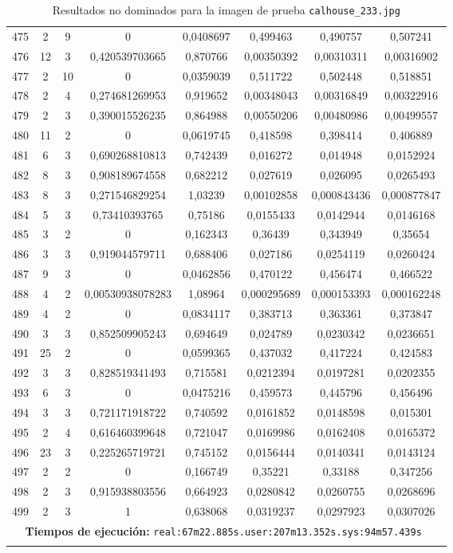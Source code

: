 \begin{longtable}{|c|c|c|c|c|c|c|c|}
475 & 2 & 9 & 0 & 0,0408697 & 0,499463 & 0,490757 & 0,507241  \\
476 & 12 & 3 & 0,420539703665 & 0,870766 & 0,00350392 & 0,00310311 & 0,00316902  \\
477 & 2 & 10 & 0 & 0,0359039 & 0,511722 & 0,502448 & 0,518851  \\
478 & 2 & 4 & 0,274681269953 & 0,919652 & 0,00348043 & 0,00316849 & 0,00322916  \\
479 & 2 & 3 & 0,390015526235 & 0,864988 & 0,00550206 & 0,00480986 & 0,00499557  \\
480 & 11 & 2 & 0 & 0,0619745 & 0,418598 & 0,398414 & 0,406889  \\
481 & 6 & 3 & 0,690268810813 & 0,742439 & 0,016272 & 0,014948 & 0,0152924  \\
482 & 8 & 3 & 0,908189674558 & 0,682212 & 0,027619 & 0,026095 & 0,0265493  \\
483 & 8 & 3 & 0,271546829254 & 1,03239 & 0,00102858 & 0,000843436 & 0,000877847  \\
484 & 5 & 3 & 0,73410393765 & 0,75186 & 0,0155433 & 0,0142944 & 0,0146168  \\
485 & 3 & 2 & 0 & 0,162343 & 0,36439 & 0,343949 & 0,35654  \\
486 & 3 & 3 & 0,919044579711 & 0,688406 & 0,027186 & 0,0254119 & 0,0260424  \\
487 & 9 & 3 & 0 & 0,0462856 & 0,470122 & 0,456474 & 0,466522  \\
488 & 4 & 2 & 0,00530938078283 & 1,08964 & 0,000295689 & 0,000153393 & 0,000162248  \\
489 & 4 & 2 & 0 & 0,0834117 & 0,383713 & 0,363361 & 0,373847  \\
490 & 3 & 3 & 0,852509905243 & 0,694649 & 0,024789 & 0,0230342 & 0,0236651  \\
491 & 25 & 2 & 0 & 0,0599365 & 0,437032 & 0,417224 & 0,424583  \\
492 & 3 & 3 & 0,828519341493 & 0,715581 & 0,0212394 & 0,0197281 & 0,0202355  \\
493 & 6 & 3 & 0 & 0,0475216 & 0,459573 & 0,445796 & 0,456496  \\
494 & 3 & 3 & 0,721171918722 & 0,740592 & 0,0161852 & 0,0148598 & 0,015301  \\
495 & 2 & 4 & 0,616460399648 & 0,721047 & 0,0169986 & 0,0162408 & 0,0165372  \\
496 & 23 & 3 & 0,225265719721 & 0,745152 & 0,0156444 & 0,0140341 & 0,0143124  \\
497 & 2 & 2 & 0 & 0,166749 & 0,35221 & 0,33188 & 0,347256  \\
498 & 2 & 3 & 0,915938803556 & 0,664923 & 0,0280842 & 0,0260755 & 0,0268696  \\
499 & 2 & 3 & 1 & 0,638068 & 0,0319237 & 0,0297923 & 0,0307026  \\
\hline
\multicolumn{8}{|c|}{\textbf{Tiempos de ejecución:} \texttt{real:67m22.885s.user:207m13.352s.sys:94m57.439s
}}\\  \hline
\caption{Resultados no dominados para la imagen de prueba \texttt{calhouse\_233.jpg}}
\label{tab:calhouse_233}
\end{longtable}
\normalsize

